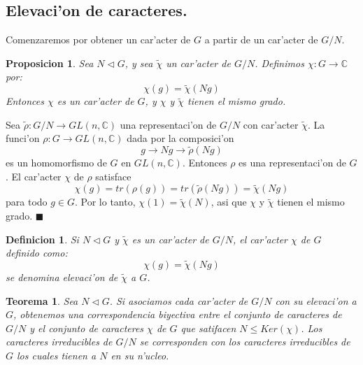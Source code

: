 \documentclass[a4paper,openright,12pt]{book}
\numberwithin{equation}{section} %
\newtheorem{teorema}{Teorema}[section] %
\newtheorem{proposicion}{Proposicion}[section] %
\newtheorem{definicion}{Definicion}[section] %
\newenvironment{proof}{\noindent{\it Demostracion:}}{\hfill$\blacksquare$} %
\begin{document}
\subsection{Elevaci'on de caracteres.}
Comenzaremos por obtener un car'acter de $G$ a partir de un car'acter de $G/N$.
\begin{proposicion}
Sea $N \triangleleft G$, y sea $\tilde \chi$ un car'acter de $G/N$. Definimos $\chi : G \rightarrow \mathbb{C}$ por:
\[
\chi(g)=\tilde \chi (Ng)
\]
Entonces $\chi$ es un car'acter de $G$, y $\chi$ y $\tilde \chi$ tienen el mismo grado.
\end{proposicion}
\begin{proof}
Sea $\tilde \rho : G/N \rightarrow GL(n, \mathbb{C})$ una representaci'on de $G/N$ con car'acter $\tilde \chi$. La funci'on $\rho : G \rightarrow GL(n, \mathbb{C})$ dada por la composici'on
\[
g \rightarrow Ng \rightarrow \tilde \rho(Ng)
\]
es un homomorfismo de $G$ en $GL(n, \mathbb{C})$. Entonces $\rho$ es una representaci'on de $G$. El car'acter $\chi$ de $\rho$ satisface
\[
\chi (g)=tr(\rho(g))=tr(\tilde \rho(Ng))=\tilde \chi (Ng)
\]
para todo $g \in G$. Por lo tanto, $\chi (1) = \tilde \chi (N)$, asi que $\chi$ y $\tilde \chi$ tienen el mismo grado.
\end{proof}
\begin{definicion}
Si $N \triangleleft G$ y $\tilde \chi$ es un car'acter de $G/N$, el car'acter $\chi$ de $G$ definido como:
\[
\chi (g) = \tilde \chi (Ng) 
\]
se denomina \emph{elevaci'on} de $\tilde \chi$ a $G$.
\end{definicion}
\begin{teorema}
Sea $N \triangleleft G$. Si asociamos cada car'acter de $G/N$ con su elevaci'on a $G$, obtenemos una correspondencia biyectiva entre el conjunto de caracteres de $G/N$ y el conjunto de caracteres $\chi$ de $G$ que satifacen $N \leq Ker(\chi)$. Los caracteres irreducibles de $G/N$ se corresponden con los caracteres irreducibles de $G$ los cuales tienen a $N$ en su n'ucleo.
\end{teorema}
\end{document}

